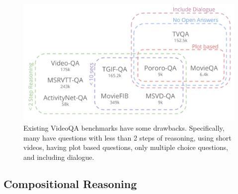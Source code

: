 \documentclass[10pt,twocolumn,letterpaper]{article}
\newcommand{\mgm}[1]{{\color{cyan}{mgm: #1}}}
\begin{document}
\begin{figure}[t]
\begin{center}
\includegraphics[width=0.8\linewidth]{Figures/figure_videoQA.png}
\end{center}
   \caption{Existing VideoQA benchmarks have some drawbacks. Specifically, many have questions with less than 2 steps of reasoning, using short videos, having plot based questions, only multiple choice questions, and including dialogue.}
\label{existing_benchmarks}
\end{figure}



\subsection{Compositional Reasoning}
\end{document}
